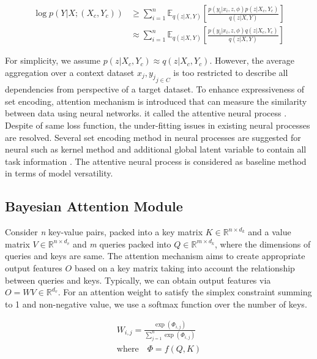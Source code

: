 \begin{equation}
\begin{split}
\label{eq2}
\log p(Y|X;(X_c, Y_c)) &\geq \sum_{i=1}^{n} \mathbb{E}_{q(z|X,Y)}\left[ \frac{p(y_i|x_i,z,\phi)p(z|X_c,Y_c)}{q(z|X,Y)} \right] \\ &\approx \sum_{i=1}^{n} \mathbb{E}_{q(z|X,Y)}\left[ \frac{p(y_i|x_i,z,\phi)q(z|X_c,Y_c)}{q(z|X,Y)} \right]
\end{split}
\end{equation}

For simplicity, we assume $p(z|X_c, Y_c) \approx q(z|X_c, Y_c)$. However, the average aggregation over a context dataset ${x_j, y_j}_{j \in C}$ is too restricted to describe all dependencies from perspective of a target dataset. To enhance expressiveness of set encoding, attention mechanism is introduced that can measure the similarity between data using neural networks. it called the attentive neural process \cite{kim2019attentive}. Despite of same loss function, the under-fitting issues in existing neural processes are resolved. Several set encoding method in neural processes are suggested for neural such as kernel method and additional global latent variable to contain all task information \cite{xu2020metafun, Fan2020bayesian}. The attentive neural process is considered as baseline method in terms of model versatility. 

\subsection {Bayesian Attention Module}
Consider \textit{n} key-value pairs, packed into a key matrix $K \in
\mathbb{R}^{n \times d_k}$ and a value matrix $V \in \mathbb{R}^{n \times d_v}$
and \textit{m} queries packed into $Q \in \mathbb{R}^{m \times d_k}$, where the
dimensions of queries and keys are same. The attention mechanism aims to create
appropriate output features $O$ based on a key matrix taking into account the
relationship between queries and keys. Typically, we can obtain output features
via $O = WV \in \mathbb{R}^{d_v}$. For an attention weight to satisfy the
simplex constraint summing to 1 and non-negative value, we use a softmax
function over the number of keys.

\begin{equation}
\begin{gathered}
    W_{i,j} = \frac{\exp(\Phi_{i,j})}{\sum_{j=1}^{n} \exp(\Phi_{i,j})}\\
    \textrm{where} \quad \Phi = f(Q, K)
\end{gathered}
\end{equation}

